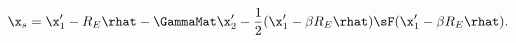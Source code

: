 \begin{equation}
\x_s= \x'_1 - R_E\rhat -  \GammaMat\x'_2 - \frac{1}{2}(\x'_1 - \beta R_E\rhat) \sF (\x'_1 - \beta R_E \rhat).
\label{eq:backgroundorder3}
\end{equation}
  